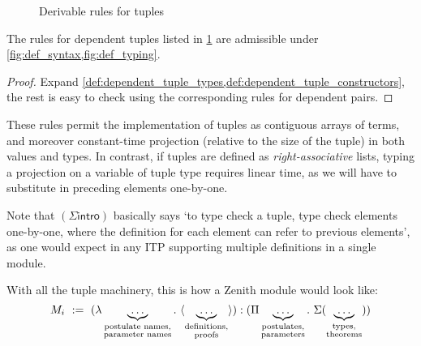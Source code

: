 \documentclass[twoside]{report}
\begin{document}
\begin{figure}[ht]
    \begin{prooftree}
    \end{prooftree}

    \begin{prooftree}
    \end{prooftree}

\caption{Derivable rules for tuples}
\label{fig:tuple_rules}
\end{figure}

\begin{proposition}
\label{thm:tuple_rules}
The rules for dependent tuples listed in \cref{fig:tuple_rules} are admissible under \cref{fig:def_syntax,fig:def_typing}.
\end{proposition}

\begin{proof}
Expand \cref{def:dependent_tuple_types,def:dependent_tuple_constructors}, the rest is easy to check using the corresponding rules for dependent pairs.
\end{proof}

These rules permit the implementation of tuples as contiguous arrays of terms, and moreover constant-time projection (relative to the size of the tuple) in both values and types. In contrast, if tuples are defined as \emph{right-associative} lists, typing a projection on a variable of tuple type requires linear time, as we will have to substitute in preceding elements one-by-one.

Note that $(\Sigma\mathsf{intro})$ basically says `to type check a tuple, type check elements one-by-one, where the definition for each element can refer to previous elements', as one would expect in any ITP supporting multiple definitions in a single module.

With all the tuple machinery, this is how a Zenith module would look like: $$M_i\ \defeq\ (\lambda \underbrace{\ldots}_{\substack{\text{postulate names,}\\\text{parameter names}}}.\ \langle \underbrace{\ldots}_{\substack{\text{definitions,}\\\text{proofs}}} \rangle) : (\Pi \underbrace{\ldots}_{\substack{\text{postulates,}\\\text{parameters}}}.\ \Sigma(\underbrace{\ldots}_{\substack{\text{types,}\\\text{theorems}}}))$$
\end{document}
